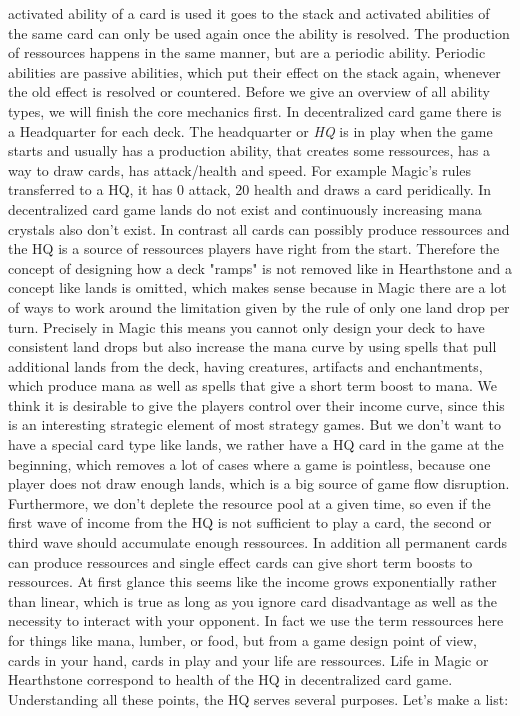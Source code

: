 \documentclass{article}
\begin{document}
activated ability of a card is used it goes to the stack and activated abilities of the same card can only be used again once the ability is resolved. The production of ressources happens in the same manner, but are a periodic ability. Periodic abilities are passive abilities, which put their effect on the stack again, whenever the old effect is resolved or countered. Before we give an overview of all ability types, we will finish the core mechanics first. In decentralized card game there is a Headquarter for each deck. The headquarter or \textit{HQ} is in play when the game starts and usually has a production ability, that creates some ressources, has a way to draw cards, has attack/health and speed. For example Magic's rules transferred to a HQ, it has 0 attack, 20 health and draws a card peridically. In decentralized card game lands do not exist and continuously increasing mana crystals also don't exist. In contrast all cards can possibly produce ressources and the HQ is a source of ressources players have right from the start. Therefore the concept of designing how a deck "ramps" is not removed like in Hearthstone and a concept like lands is omitted, which makes sense because in Magic there are a lot of ways to work around the limitation given by the rule of only one land drop per turn. Precisely in Magic this means you cannot only design your deck to have consistent land drops but also increase the mana curve by using spells that pull additional lands from the deck, having creatures, artifacts and enchantments, which produce mana as well as spells that give a short term boost to mana. We think it is desirable to give the players control over their income curve, since this is an interesting strategic element of most strategy games. But we don't want to have a special card type like lands, we rather have a HQ card in the game at the beginning, which removes a lot of cases where a game is pointless, because one player does not draw enough lands, which is a big source of game flow disruption. Furthermore, we don't deplete the resource pool at a given time, so even if the first wave of income from the HQ is not sufficient to play a card, the second or third wave should accumulate enough ressources. In addition all permanent cards can produce ressources and single effect cards can give short term boosts to ressources. At first glance this seems like the income grows exponentially rather than linear, which is true as long as you ignore card disadvantage as well as the necessity to interact with your opponent. In fact we use the term ressources here for things like mana, lumber, or food, but from a game design point of view, cards in your hand, cards in play and your life are ressources. Life in Magic or Hearthstone correspond to health of the HQ in decentralized card game. Understanding all these points, the HQ serves several purposes. Let's make a list:
\end{document}
